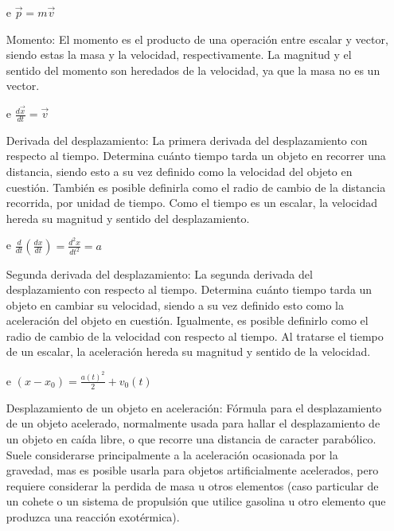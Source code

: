 \documentclass[letterpaper, 12pt]{article}
\begin{document}
\begin{itemize}
    \item[e] $\vec p =  m \vec v$ \newline

    Momento: El momento es el producto de una operaci\'on entre escalar y vector, siendo estas la masa y la velocidad, respectivamente. La magnitud y el sentido del momento son heredados de la velocidad, ya que la masa no es un vector. \newline
    
    \item[e] $\frac{d\vec x}{dt} = \vec v$ \newline

    Derivada del desplazamiento: La primera derivada del desplazamiento con respecto al tiempo. Determina cu\'anto tiempo tarda un objeto en recorrer una distancia, siendo esto a su vez definido como la velocidad del objeto en cuesti\'on. Tambi\'en es posible definirla como el radio de cambio de la distancia recorrida, por unidad de tiempo. Como el tiempo es un escalar, la velocidad hereda su magnitud y sentido del desplazamiento. \newline
    
    \item[e] $\frac{d}{dt}(\frac{dx}{dt}) = \frac{d^2 x}{dt^2} = a$ \newline

    Segunda derivada del desplazamiento: La segunda derivada del desplazamiento con respecto al tiempo. Determina cu\'anto tiempo tarda un objeto en cambiar su velocidad, siendo a su vez definido esto como la aceleraci\'on del objeto en cuesti\'on. Igualmente, es posible definirlo como el radio de cambio de la velocidad con respecto al tiempo. Al tratarse el tiempo de un escalar, la aceleraci\'on hereda su magnitud y sentido de la velocidad. \newline
    
    \item[e] $(x-x_0) = \frac{a(t)^2}{2} + v_0(t)$ \newline

    Desplazamiento de un objeto en aceleraci\'on: F\'ormula para el desplazamiento de un objeto acelerado, normalmente usada para hallar el desplazamiento de un objeto en ca\'ida libre, o que recorre una distancia de caracter parab\'olico. Suele considerarse principalmente a la aceleraci\'on ocasionada por la gravedad, mas es posible usarla para objetos artificialmente acelerados, pero requiere considerar la perdida de masa u otros elementos (caso particular de un cohete o un sistema de propulsi\'on que utilice gasolina u otro elemento que produzca una reacci\'on exot\'ermica). \newline
    

\end{itemize}
\end{document}
